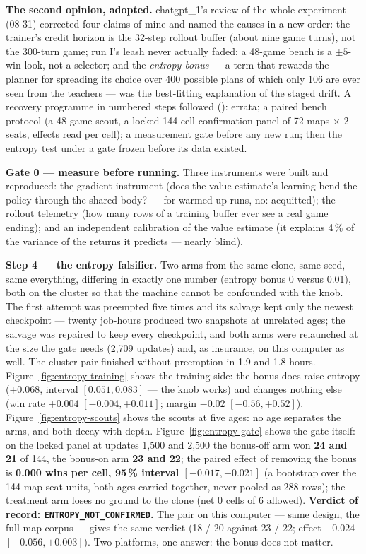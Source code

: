 \documentclass[11pt,a4paper]{article}
\newcommand{\fp}[1]{{\small\path{#1}}}
\begin{document}
\textbf{The second opinion, adopted.} chatgpt\_1's review of the whole experiment (08-31) corrected four claims of mine and named the causes in a new order: the trainer's credit horizon is the 32-step rollout buffer (about nine game turns), not the 300-turn game; run I's leash never actually faded; a 48-game bench is a $\pm 5$-win look, not a selector; and the \emph{entropy bonus} --- a term that rewards the planner for spreading its choice over 400 possible plans of which only 106 are ever seen from the teachers --- was the best-fitting explanation of the staged drift. A recovery programme in numbered steps followed (\fp{coordination/GOAL.md}): errata; a paired bench protocol (a 48-game scout, a locked 144-cell confirmation panel of 72 maps $\times$ 2 seats, effects read per cell); a measurement gate before any new run; then the entropy test under a gate frozen before its data existed.

\textbf{Gate 0 --- measure before running.} Three instruments were built and reproduced: the gradient instrument (does the value estimate's learning bend the policy through the shared body? --- for warmed-up runs, no: acquitted); the rollout telemetry (how many rows of a training buffer ever see a real game ending); and an independent calibration of the value estimate (it explains 4\,\% of the variance of the returns it predicts --- nearly blind).

\textbf{Step 4 --- the entropy falsifier.} Two arms from the same clone, same seed, same everything, differing in exactly one number (entropy bonus 0 versus 0.01), both on the cluster so that the machine cannot be confounded with the knob. The first attempt was preempted five times and its salvage kept only the newest checkpoint --- twenty job-hours produced two snapshots at unrelated ages; the salvage was repaired to keep every checkpoint, and both arms were relaunched at the size the gate needs (2,709 updates) and, as insurance, on this computer as well. The cluster pair finished without preemption in 1.9 and 1.8 hours. Figure~\ref{fig:entropy-training} shows the training side: the bonus does raise entropy ($+0.068$, interval $[0.051, 0.083]$ --- the knob works) and changes nothing else (win rate $+0.004$ $[-0.004, +0.011]$; margin $-0.02$ $[-0.56, +0.52]$). Figure~\ref{fig:entropy-scouts} shows the scouts at five ages: no age separates the arms, and both decay with depth. Figure~\ref{fig:entropy-gate} shows the gate itself: on the locked panel at updates 1,500 and 2,500 the bonus-off arm won \textbf{24 and 21} of 144, the bonus-on arm \textbf{23 and 22}; the paired effect of removing the bonus is \textbf{0.000 wins per cell, 95\,\% interval $[-0.017, +0.021]$} (a bootstrap over the 144 map-seat units, both ages carried together, never pooled as 288 rows); the treatment arm loses no ground to the clone (net 0 cells of 6 allowed). \textbf{Verdict of record: \texttt{ENTROPY\_NOT\_CONFIRMED}.} The pair on this computer --- same design, the full map corpus --- gives the same verdict (18 / 20 against 23 / 22; effect $-0.024$ $[-0.056, +0.003]$). Two platforms, one answer: the bonus does not matter.
\end{document}
